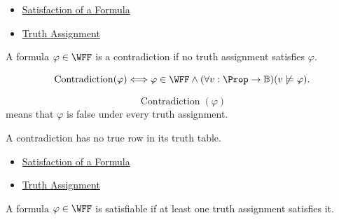 \begin{dependencies}
\begin{itemize}
  \item \hyperref[def:satisfaction-propositional-formula]{Satisfaction of a Formula}
  \item \hyperref[def:truth-assignment-propositional-logic]{Truth Assignment}
\end{itemize}
\end{dependencies}
\begin{tcolorbox}[colback=propbox, colframe=propborder, arc=2pt,
  left=6pt, right=6pt, top=4pt, bottom=4pt,
  title={\small\textbf{Definition (Contradiction)}},
  fonttitle=\small\bfseries]
\begin{definition}[Contradiction]
\label{def:contradiction-propositional-logic}
A formula \(\varphi\in\WFF\) is a contradiction if no truth assignment satisfies \(\varphi\).
\end{definition}
\end{tcolorbox}

\begin{remark*}
\[
\operatorname{Contradiction}(\varphi)
\Longleftrightarrow
\varphi\in\WFF
\land
(\forall v:\Prop\to\mathbb{B})(v\not\models\varphi).
\]
\end{remark*}

\begin{remark*}
\[
\operatorname{Contradiction}(\varphi)
\]
means that \(\varphi\) is false under every truth assignment.
\end{remark*}

\begin{remark*}[Interpretation]
A contradiction has no true row in its truth table.
\end{remark*}

\begin{dependencies}
\begin{itemize}
  \item \hyperref[def:satisfaction-propositional-formula]{Satisfaction of a Formula}
  \item \hyperref[def:truth-assignment-propositional-logic]{Truth Assignment}
\end{itemize}
\end{dependencies}
\begin{tcolorbox}[colback=propbox, colframe=propborder, arc=2pt,
  left=6pt, right=6pt, top=4pt, bottom=4pt,
  title={\small\textbf{Definition (Satisfiable Formula)}},
  fonttitle=\small\bfseries]
\begin{definition}
\label{def:satisfiable-formula-propositional-logic}
A formula \(\varphi\in\WFF\) is satisfiable if at least one truth assignment satisfies it.
\end{definition}
\end{tcolorbox}

